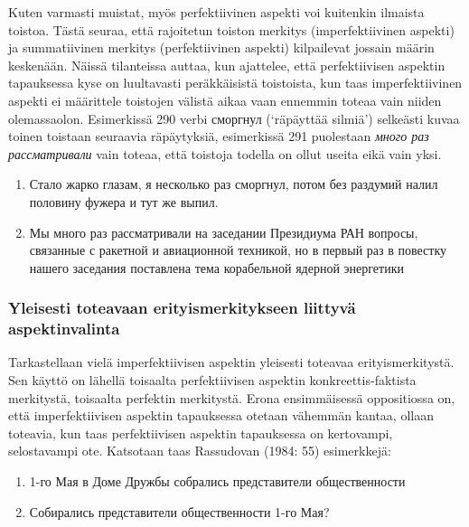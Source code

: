 \documentclass[]{scrartcl}
\providecommand{\tightlist}{%
  \setlength{\itemsep}{0pt}\setlength{\parskip}{0pt}}
\begin{document}
Kuten varmasti muistat, myös perfektiivinen aspekti voi kuitenkin
ilmaista toistoa. Tästä seuraa, että rajoitetun toiston merkitys
(imperfektiivinen aspekti) ja summatiivinen merkitys (perfektiivinen
aspekti) kilpailevat jossain määrin keskenään. Näissä tilanteissa
auttaa, kun ajattelee, että perfektiivisen aspektin tapauksessa kyse on
luultavasti peräkkäisistä toistoista, kun taas imperfektiivinen aspekti
ei määrittele toistojen välistä aikaa vaan ennemmin toteaa vain niiden
olemassaolon. Esimerkissä 290 verbi сморгнул (`räpäyttää silmiä')
selkeästi kuvaa toinen toistaan seuraavia räpäytyksiä, esimerkissä 291
puolestaan \emph{много раз рассматривали} vain toteaa, että toistoja
todella on ollut useita eikä vain yksi.

\begin{enumerate}
\def\labelenumi{(\arabic{enumi})}
\setcounter{enumi}{289}
\tightlist
\item
  Стало жарко глазам, я несколько раз сморгнул, потом без раздумий налил
  половину фужера и тут же выпил.
\item
  Мы много раз рассматривали на заседании Президиума РАН вопросы,
  связанные с ракетной и авиационной техникой, но в первый раз в
  повестку нашего заседания поставлена тема корабельной ядерной
  энергетики
\end{enumerate}

\subsubsection{Yleisesti toteavaan erityismerkitykseen liittyvä
aspektinvalinta}\label{yleisesti-toteavaan-erityismerkitykseen-liittyvuxe4-aspektinvalinta}

Tarkastellaan vielä imperfektiivisen aspektin yleisesti toteavaa
erityismerkitystä. Sen käyttö on lähellä toisaalta perfektiivisen
aspektin konkreettis-faktista merkitystä, toisaalta perfektin
merkitystä. Erona ensimmäisessä oppositiossa on, että imperfektiivisen
aspektin tapauksessa otetaan vähemmän kantaa, ollaan toteavia, kun taas
perfektiivisen aspektin tapauksessa on kertovampi, selostavampi ote.
Katsotaan taas Rassudovan (1984: 55) esimerkkejä:

\begin{enumerate}
\def\labelenumi{(\arabic{enumi})}
\setcounter{enumi}{291}
\tightlist
\item
  1-го Мая в Доме Дружбы собрались представители общественности
\item
  Собирались представители общественности 1-го Мая?
\end{enumerate}
\end{document}
